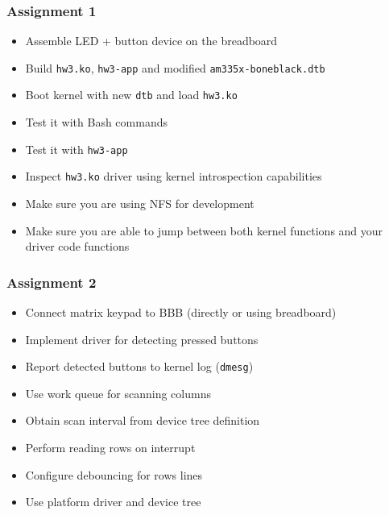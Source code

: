 \documentclass[aspectratio=169,usenames,dvipsnames]{beamer}
\begin{document}
\begin{frame}
  \frametitle{Assignment 1}
  \begin{itemize}
    \item Assemble LED + button device on the breadboard
    \item Build \texttt{hw3.ko}, \texttt{hw3-app} and modified
          \texttt{am335x-boneblack.dtb}
    \item Boot kernel with new \texttt{dtb} and load \texttt{hw3.ko}
    \item Test it with Bash commands
    \item Test it with \texttt{hw3-app}
    \item Inspect \texttt{hw3.ko} driver using kernel introspection capabilities
    \item Make sure you are using NFS for development
    \item Make sure you are able to jump between both kernel functions and
          your driver code functions
  \end{itemize}
\end{frame}

\begin{frame}
  \frametitle{Assignment 2}
  \begin{itemize}
    \item Connect matrix keypad to BBB (directly or using breadboard)
    \item Implement driver for detecting pressed buttons
    \item Report detected buttons to kernel log (\texttt{dmesg})
    \item Use work queue for scanning columns
    \item Obtain scan interval from device tree definition
    \item Perform reading rows on interrupt
    \item Configure debouncing for rows lines
    \item Use platform driver and device tree
  \end{itemize}
\end{frame}
\end{document}
